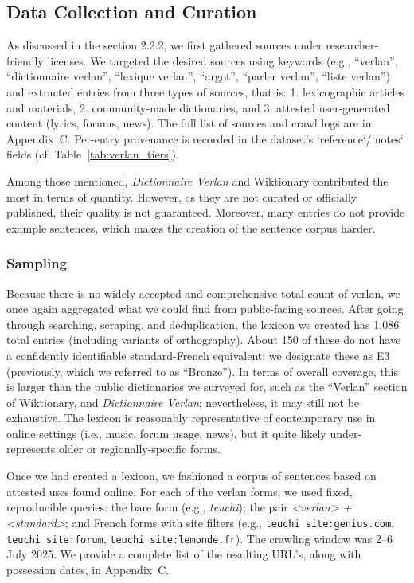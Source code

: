 \documentclass[12pt]{article}
\begin{document}
\subsection{Data Collection and Curation}
As discussed in the section 2.2.2, we first gathered sources under researcher-friendly licenses. We targeted the desired sources using keywords (e.g., ``verlan'', ``dictionnaire verlan'', ``lexique verlan'', ``argot'', ``parler verlan'', ``liste verlan'') and extracted entries from three types of sources, that is: 1. lexicographic articles and materials, 2. community-made dictionaries, and 3. attested user-generated content (lyrics, forums, news). The full list of sources and crawl logs are in Appendix~C. Per-entry provenance is recorded in the dataset's `reference`/`notes` fields (cf. Table~\ref{tab:verlan_tiers}).

Among those mentioned, \textit{Dictionnaire Verlan} and Wiktionary contributed the most in terms of quantity. However, as they are not curated or officially published, their quality is not guaranteed. Moreover, many entries do not provide example sentences, which makes the creation of the sentence corpus harder.

\subsubsection{Sampling}

Because there is no widely accepted and comprehensive total count of verlan, we once again aggregated what we could find from public-facing sources. After going through searching, scraping, and deduplication, the lexicon we created has 1{,}086 total entries (including variants of orthography). About 150 of these do not have a confidently identifiable standard-French equivalent; we designate these as E3 (previously, which we referred to as ``Bronze''). In terms of overall coverage, this is larger than the public dictionaries we surveyed for, such as the ``Verlan'' section of Wiktionary, and \textit{Dictionnaire Verlan}; nevertheless, it may still not be exhaustive. The lexicon is reasonably representative of contemporary use in online settings (i.e., music, forum usage, news), but it quite likely under-represents older or regionally-specific forms.

Once we had created a lexicon, we fashioned a corpus of sentences based on attested uses found online. For each of the verlan forms, we used fixed, reproducible queries: the bare form (e.g., \textit{teuchi}); the pair \textit{<verlan> + <standard>}; and French forms with site filters (e.g., \texttt{teuchi site:genius.com}, \texttt{teuchi site:forum}, \texttt{teuchi site:lemonde.fr}). The crawling window was 2--6 July 2025. We provide a complete list of the resulting URL's, along with possession dates, in Appendix~C.
\end{document}
